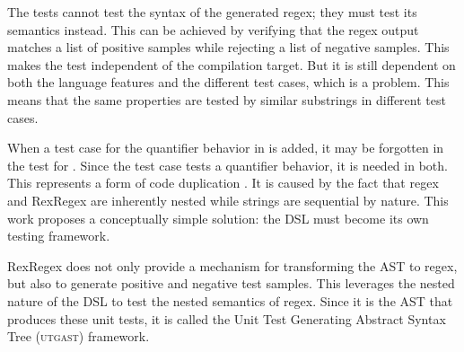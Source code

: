 The tests cannot test the syntax of the generated regex; they must test its semantics instead. This can be achieved by verifying that the regex output matches a list of positive samples while rejecting a list of negative samples. This makes the test independent of the compilation target. But it is still dependent on both the language features and the different test cases, which is a problem. This means that the same properties are tested by similar substrings in different test cases. 

When a test case for the quantifier behavior in  is added, it may be forgotten in the test for . Since the test case tests a quantifier behavior, it is needed in both. This represents a form of code duplication \cite[p.~4]{refactoring}. It is caused by the fact that regex and RexRegex are inherently nested while strings are sequential by nature. This work proposes a conceptually simple solution: the DSL must become its own testing framework.

RexRegex does not only provide a mechanism for transforming the AST to regex, but also to generate positive and negative test samples. This leverages the nested nature of the DSL to test the nested semantics of regex. Since it is the AST that produces these unit tests, it is called the Unit Test Generating Abstract Syntax Tree (\textsc{utgast}) framework.

